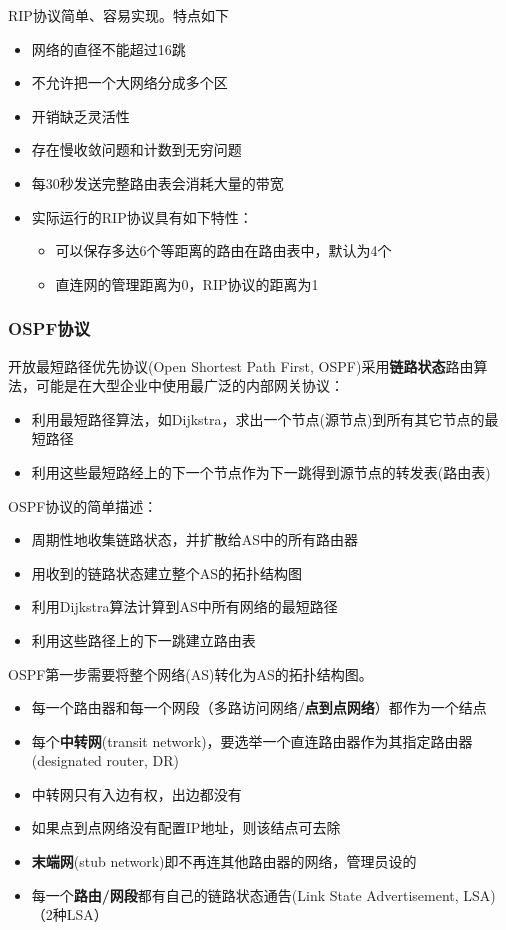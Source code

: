 RIP协议简单、容易实现。特点如下
\begin{itemize}
\item 网络的直径不能超过16跳
\item 不允许把一个大网络分成多个区
\item 开销缺乏灵活性
\item 存在慢收敛问题和计数到无穷问题
\item 每30秒发送完整路由表会消耗大量的带宽
\item 实际运行的RIP协议具有如下特性：
\begin{itemize}
\item 可以保存多达6个等距离的路由在路由表中，默认为4个
\item 直连网的管理距离为0，RIP协议的距离为1
\end{itemize}
\end{itemize}

\subsubsection{OSPF协议}
开放最短路径优先协议(Open Shortest Path First, OSPF)采用\textbf{链路状态}路由算法，可能是在大型企业中使用最广泛的内部网关协议：
\begin{itemize}
	\item 利用最短路径算法，如Dijkstra，求出一个节点(源节点)到所有其它节点的最短路径
	\item 利用这些最短路经上的下一个节点作为下一跳得到源节点的转发表(路由表)
\end{itemize}

OSPF协议的简单描述：
\begin{itemize}
\item 周期性地收集链路状态，并扩散给AS中的所有路由器
\item 用收到的链路状态建立整个AS的拓扑结构图
\item 利用Dijkstra算法计算到AS中所有网络的最短路径
\item 利用这些路径上的下一跳建立路由表
\end{itemize}

OSPF第一步需要将整个网络(AS)转化为AS的拓扑结构图。
\begin{itemize}
	\item 每一个路由器和每一个网段（多路访问网络/\textbf{点到点网络}）都作为一个结点
	\item 每个\textbf{中转网}(transit network)，要选举一个直连路由器作为其指定路由器(designated router, DR)
	\item 中转网只有入边有权，出边都没有
	\item 如果点到点网络没有配置IP地址，则该结点可去除
	\item \textbf{末端网}(stub network)即不再连其他路由器的网络，管理员设的
	\item 每一个\textbf{路由/网段}都有自己的链路状态通告(Link State Advertisement, LSA)（2种LSA）
\end{itemize}

